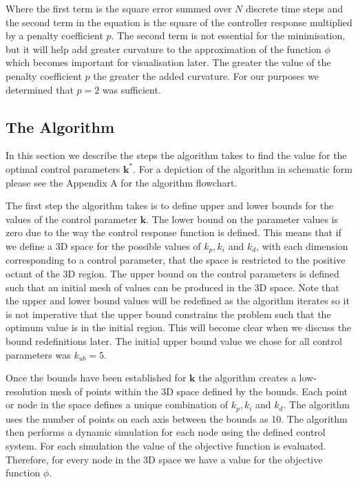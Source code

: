 \documentclass[conference]{IEEEtran}
\theoremstyle{definition}
\begin{document}
\noindent Where the first term is the square error summed over $N$ discrete time steps and the second term in the equation is the square of the controller response multiplied by a penalty coefficient $p$. The second term is not essential for the minimisation, but it will help add greater curvature to the approximation of the function $\phi$ which becomes important for visualisation later. The greater the value of the penalty coefficient $p$ the greater the added curvature. For our purposes we determined that $p=2$ was sufficient.

\subsection{The Algorithm}
\noindent In this section we describe the steps the algorithm takes to find the value for the optimal control parameters $\mathbf{k}^*$. For a depiction of the algorithm in schematic form please see the Appendix A for the algorithm flowchart. 

The first step the algorithm takes is to define upper and lower bounds for the values of the control parameter $\mathbf{k}$. The lower bound on the parameter values is zero due to the way the control response function is defined. This means that if we define a 3D space for the possible values of $k_p, k_i$ and $k_d$, with each dimension corresponding to a control parameter, that the space is restricted to the positive octant of the 3D region. The upper bound on the control parameters is defined such that an initial mesh of values can be produced in the 3D space. Note that the upper and lower bound values will be redefined as the algorithm iterates so it is not imperative that the upper bound constrains the problem such that the optimum value is in the initial region. This will become clear when we discuss the bound redefinitions later. The initial upper bound value we chose for all control parameters was $k_{ub}=5$.

Once the bounds have been established for $\mathbf{k}$ the algorithm creates a low-resolution mesh of points within the 3D space defined by the bounds. Each point or node in the space defines a unique combination of $k_p, k_i$ and $k_d$. The algorithm uses the number of points on each axis between the bounds as 10. The algorithm then performs a dynamic simulation for each node using the defined control system. For each simulation the value of the objective function is evaluated. Therefore, for every node in the 3D space we have a value for the objective function $\phi$.
\end{document}
